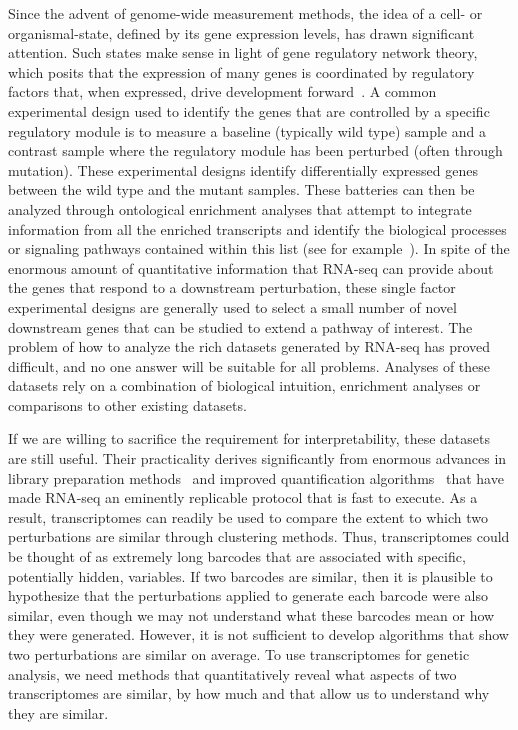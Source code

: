 Since the advent of genome-wide measurement methods, the idea of a cell- or
organismal-state, defined by its gene expression levels, has drawn significant
attention. Such states make sense in light of gene regulatory network theory,
which posits that the expression of many genes is coordinated by regulatory
factors that, when expressed, drive development forward~\citep{Britten1969}. A
common experimental design used to identify the genes that are controlled by a
specific regulatory module is to measure a baseline (typically wild type) sample
and a contrast sample where the regulatory module has been perturbed (often
through mutation). These experimental designs identify differentially expressed
genes between the wild type and the mutant samples. These batteries can then be
analyzed through ontological enrichment analyses that attempt to integrate
information from all the enriched transcripts and identify the biological
processes or signaling pathways contained within this list (see for
example~\citet{Mi2009,Angeles-Albores2016}). In spite of the enormous amount of
quantitative information that RNA-seq can provide about the genes that respond
to a downstream perturbation, these single factor experimental designs are
generally used to select a small number of novel downstream genes that can be
studied to extend a pathway of interest. The problem of how to analyze the rich
datasets generated by RNA-seq has proved difficult, and no one answer will be
suitable for all problems. Analyses of these datasets rely on a combination of
biological intuition, enrichment analyses or comparisons to other existing
datasets.

If we are willing to sacrifice the requirement for interpretability, these
datasets are still useful. Their practicality derives significantly from
enormous advances in library preparation methods~\citep{Picelli2014} and
improved quantification algorithms~\citep{Patro2014,Patro2015,Bray2016} that
have made RNA-seq an eminently replicable protocol that is fast to execute. As a
result, transcriptomes can readily be used to compare the extent to which two
perturbations are similar through clustering methods. Thus, transcriptomes could
be thought of as extremely long barcodes that are associated with specific,
potentially hidden, variables. If two barcodes are similar, then it is plausible
to hypothesize that the perturbations applied to generate each barcode were also
similar, even though we may not understand what these barcodes mean or how they
were generated. However, it is not sufficient to develop algorithms that show
two perturbations are similar on average. To use transcriptomes for genetic
analysis, we need methods that quantitatively reveal what aspects of two
transcriptomes are similar, by how much and that allow us to understand why they
are similar.

